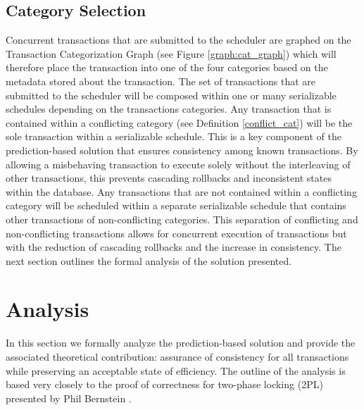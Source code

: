 \documentclass[conference]{IEEEtran}
\newtheorem{example}{Example}[definition]
\begin{document}
 
  
 
 
\subsection{Category Selection}
Concurrent transactions that are submitted to the scheduler are graphed on the Transaction Categorization Graph (see Figure \ref{graph:cat_graph}) which will therefore place the transaction into one of the four categories based on the metadata stored about the transaction. The set of transactions that are submitted to the scheduler will be composed within one or many serializable schedules depending on the transactions categories. Any transaction that is contained within a conflicting category (see Definition \ref{conflict_cat}) will be the sole transaction within a serializable schedule. This is a key component of the prediction-based solution that ensures consistency among known transactions. By allowing a misbehaving transaction to execute solely without the interleaving of other transactions, this prevents cascading rollbacks and inconsistent states within the database. Any transactions that are not contained within a conflicting category will be scheduled within a separate serializable schedule that contains other transactions of non-conflicting categories. This separation of conflicting and non-conflicting transactions allows for concurrent execution of transactions but with the reduction of cascading rollbacks and the increase in consistency. The next section outlines the formal analysis of the solution presented.

\section{Analysis}
\label{sec:analysis}
In this section we formally analyze the prediction-based solution and provide the associated theoretical contribution: assurance of consistency for all transactions while preserving an acceptable state of efficiency. The outline of the analysis is based very closely to the proof of correctness for two-phase locking (2PL) presented by Phil Bernstein \cite[pp. 53-56]{Bernstein_1986:CCR:17299}. 
\end{document}
